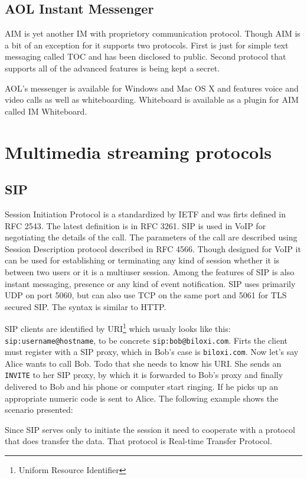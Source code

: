 \subsection*{AOL Instant Messenger}
AIM is yet another IM with proprietory communication protocol. Though AIM is a bit of an exception for it supports two protocols. First is just for simple text messaging called TOC and has been disclosed to public. Second protocol that supports all of the advanced features is being kept a secret.

AOL's messenger is available for Windows and Mac OS X and features voice and video calls as well as whiteboarding. Whiteboard is available as a plugin for AIM called IM Whiteboard. 

\section{Multimedia streaming protocols}
\subsection*{SIP}
Session Initiation Protocol is a standardized by IETF and was firts defined in RFC 2543. The latest definition is in RFC 3261. SIP is used in VoIP for negotiating the details of the call. The parameters of the call are described using Session Description protocol described in RFC 4566. Though designed for VoIP it can be used for establishing or terminating any kind of session whether it is between two users or it is a multiuser session. Among the features of SIP is also instant messaging, presence or any kind of event notification. SIP uses primarily UDP on port 5060, but can also use TCP on the same port and 5061 for TLS secured SIP. The syntax is similar to HTTP.

SIP clients are identified by URI\footnote{Uniform Resource Identifier} which usualy looks like this: \verb|sip:username@hostname|, to be concrete \verb|sip:bob@biloxi.com|. Firts the client must register with a SIP proxy, which in Bob's case is \verb|biloxi.com|. Now let's say Alice wants to call Bob. Todo that she needs to know his URI. She sends an \verb|INVITE| to her SIP proxy, by which it is forwarded to Bob's proxy and finally delivered to Bob and his phone or computer start ringing. If he picks up an appropriate numeric code is sent to Alice. The following example\cite{SIPRFC} shows the scenario presented:    



Since SIP serves only to initiate the session it need to cooperate with a protocol that does transfer the data. That protocol is Real-time Transfer Protocol.  

